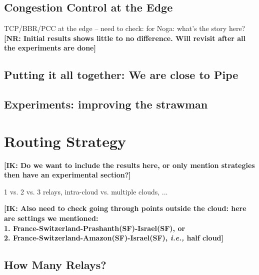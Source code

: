 \documentclass[sigconf,usenames,dvipsnames,geometry]{acmart}
\newcommand{\mycomm}[3]{{\color{#2} \textbf{[#1: #3]}}}
\newcommand{\mycomm}[3]{}
\newcommand{\IK}[1]{\mycomm{IK}{blue}{#1}}
\newcommand{\NR}[1]{\mycomm{NR}{OliveGreen}{#1}}
\providecommand{\ie}{\emph{i.e.,} }
\begin{document}
\subsection{Congestion Control at the Edge}

TCP/BBR/PCC at the edge -- need to check: for Noga: what's the story here? \NR{Initial results shows little to no difference. Will revisit after all the experiments are done}

\subsection{Putting it all together: We are close to Pipe}

\subsection{Experiments: improving the strawman}

\section{Routing Strategy}

\IK{Do we want to include the results here, or only mention strategies then have an experimental section?}

1 vs. 2 vs. 3 relays, intra-cloud vs. multiple clouds, ...


\IK{Also need to check going through points outside the cloud: here are settings we mentioned:\\
1. France-Switzerland-Prashanth(SF)-Israel(SF), or\\
2. France-Switzerland-Amazon(SF)-Israel(SF), \ie half cloud}


\subsection{How Many Relays?} \label{sec:numb_of_relays}
\end{document}
